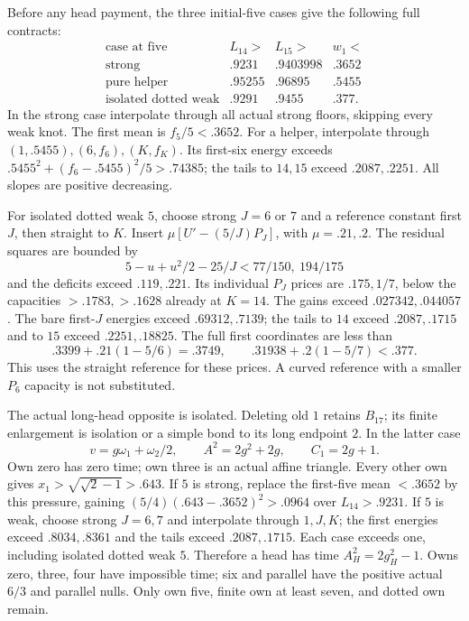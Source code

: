 Before any head payment, the three initial-five cases give the
following full contracts:
\[
\begin{array}{c|cc|c}
\text{case at five}&L_{14}>&L_{15}>&w_1<\\ \hline
\text{strong}&.9231&.9403998&.3652\\
\text{pure helper}&.95255&.96895&.5455\\
\text{isolated dotted weak}&.9291&.9455&.377 .
\end{array}
\]
In the strong case interpolate through all actual strong floors,
skipping every weak knot. The first mean is \(f_5/5<.3652\).
For a helper, interpolate through \((1,.5455),(6,f_6),(K,f_K)\).
Its first-six energy exceeds
\(.5455^2+(f_6-.5455)^2/5>.74385\);
the tails to \(14,15\) exceed \(.2087,.2251\).
All slopes are positive decreasing.

For isolated dotted weak \(5\), choose strong \(J=6\) or \(7\)
and a reference constant first \(J\), then straight to \(K\).
Insert \(\mu[U'-(5/J)P_J]\), with \(\mu=.21,.2\).
The residual squares are bounded by
\[
 5-u+u^2/2-25/J<77/150,\ 194/175
\]
and the deficits exceed \(.119,.221\).
Its individual \(P_J\) prices are \(.175,1/7\),
below the capacities \(>.1783,>.1628\) already at \(K=14\).
The gains exceed \(.027342,.044057\).
The bare first-\(J\) energies exceed \(.69312,.7139\);
the tails to \(14\) exceed \(.2087,.1715\) and to \(15\)
exceed \(.2251,.18825\).
The full first coordinates are less than
\[
 .3399+.21(1-5/6)=.3749,\qquad
 .31938+.2(1-5/7)<.377.
\]
This uses the straight reference for these prices. A curved
reference with a smaller \(P_6\) capacity is not substituted.

The actual long-head opposite is isolated. Deleting old \(1\)
retains \(B_{17}\); its finite enlargement is isolation or a
simple bond to its long endpoint \(2\). In the latter case
\[
 v=g\omega_1+\omega_2/2,\qquad A^2=2g^2+2g,\qquad C_1=2g+1.
\]
Own zero has zero time; own three is an actual affine triangle.
Every other own gives \(x_1>\sqrt{\sqrt2-1}>.643\).
If \(5\) is strong, replace the first-five mean \(<.3652\)
by this pressure, gaining
\((5/4)(.643-.3652)^2>.0964\) over \(L_{14}>.9231\).
If \(5\) is weak, choose strong \(J=6,7\) and interpolate
through \(1,J,K\); the first energies exceed \(.8034,.8361\)
and the tails exceed \(.2087,.1715\).
Each case exceeds one, including isolated dotted weak \(5\).
Therefore a head has time \(A_H^2=2g_H^2-1\).
Owns zero, three, four have impossible time; six and parallel
have the positive actual \(6/3\) and parallel nulls.
Only own five, finite own at least seven, and dotted own remain.

